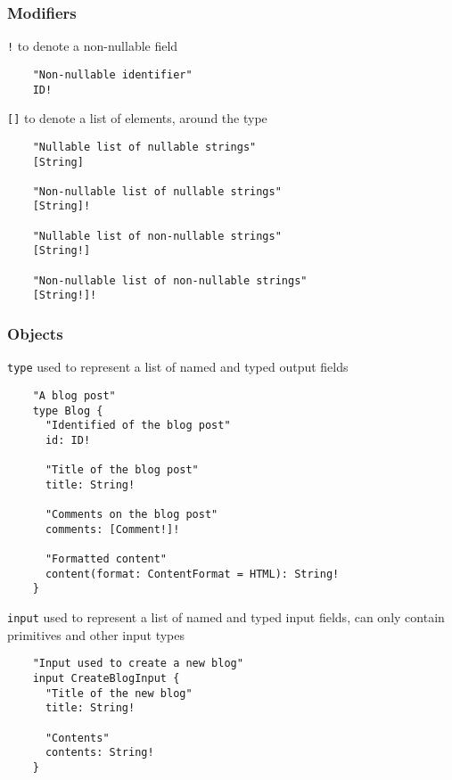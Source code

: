 \documentclass[notes]{beamer}
\begin{document}
\begin{frame}[fragile]
  \frametitle{Modifiers} \texttt{!} to denote a non-nullable field
  \begin{verbatim}
    "Non-nullable identifier"
    ID!
\end{verbatim}

  \texttt{[]} to denote a list of elements, around the type
  \begin{verbatim}
    "Nullable list of nullable strings"
    [String]

    "Non-nullable list of nullable strings"
    [String]!

    "Nullable list of non-nullable strings"
    [String!]

    "Non-nullable list of non-nullable strings"
    [String!]!
\end{verbatim}
\end{frame}


\begin{frame}[fragile]
  \frametitle{Objects}
  \texttt{type} used to represent a list of named
  and typed output fields
  \begin{verbatim}
    "A blog post"
    type Blog {
      "Identified of the blog post"
      id: ID!

      "Title of the blog post"
      title: String!

      "Comments on the blog post"
      comments: [Comment!]!

      "Formatted content"
      content(format: ContentFormat = HTML): String!
    }
\end{verbatim}

  \texttt{input} used to represent a list of named and typed input
  fields, can only contain primitives and other input types
  \begin{verbatim}
    "Input used to create a new blog"
    input CreateBlogInput {
      "Title of the new blog"
      title: String!

      "Contents"
      contents: String!
    }
\end{verbatim}
\end{frame}
\end{document}

